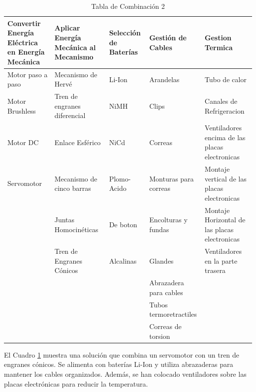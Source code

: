     \begin{table}[H]
    \centering
    \begin{tabularx}{\textwidth}{|X|X|X|X|X|}
    \hline
    \textbf{Convertir Energía Eléctrica en Energía Mecánica} & \textbf{Aplicar Energía Mecánica al Mecanismo} & \textbf{Selección de Baterías} & \textbf{Gestión de Cables} & \textbf{Gestion Termica} \\
    \hline
    Motor paso a paso & Mecanismo de Hervé & \cellcolor{green}Li-Ion  & Arandelas & Tubo de calor\\
    \hline
    Motor Brushless & Tren de engranes diferencial & NiMH & Clips & Canales de Refrigeracion \\
    \hline
    Motor DC & Enlace Esférico & NiCd & Correas & \cellcolor{green}Ventiladores encima de las placas electronicas\\
    \hline
    \cellcolor{green}Servomotor & Mecanismo de cinco barras & Plomo-Acido & Monturas para correas & Montaje vertical de las placas electronicas\\
    \hline
     & Juntas Homocinéticas & De boton & Encolturas y fundas & Montaje Horizontal de las placas electronicas\\
    \hline
     & \cellcolor{green}Tren de Engranes Cónicos & Alcalinas & Glandes & Ventiladores en la parte trasera\\
    \hline
     & & & \cellcolor{green}Abrazadera para cables & \\
    \hline
     & & & Tubos termoretractiles & \\
    \hline
     & & & Correas de torsion & \\
    \hline
    \end{tabularx}
    \caption{Tabla de Combinación 2}
    \label{tab:combinacion_2}
    \end{table}

    El Cuadro \ref{tab:combinacion_2} muestra una solución que combina un servomotor con un tren de engranes cónicos. Se alimenta con baterías Li-Ion y utiliza abrazaderas para mantener los cables organizados. Además, se han colocado ventiladores sobre las placas electrónicas para reducir la temperatura.

